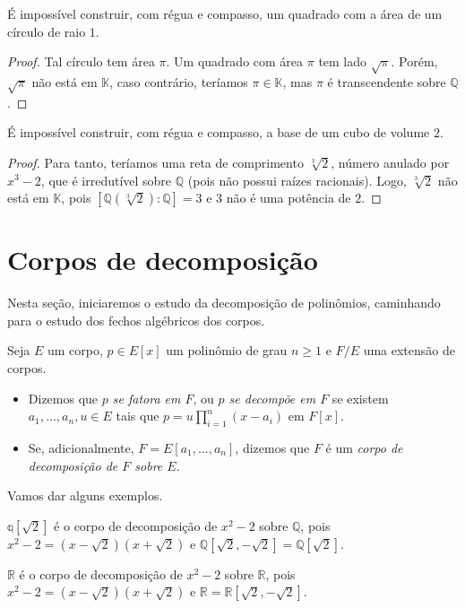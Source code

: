 \begin{prop}
    É impossível construir, com régua e compasso, um quadrado com a área de um círculo de raio $1$.
\end{prop}
\begin{proof}
Tal círculo tem área $\pi$. Um quadrado com área $\pi$ tem lado $\sqrt \pi$. Porém, $\sqrt \pi$ não está em $\mathbb K$, caso contrário, teríamos $\pi \in \mathbb K$, mas $\pi$ é transcendente sobre $\mathbb Q$.
\end{proof}

\begin{prop}
É impossível construir, com régua e compasso, a base de um cubo de volume $2$.
\end{prop}
\begin{proof}
    Para tanto, teríamos uma reta de comprimento $\sqrt[3]{2}$, número anulado por $x^3-2$, que é irredutível sobre $\mathbb Q$ (pois não possui raízes racionais). Logo, $\sqrt[3]{2}$ não está em $\mathbb K$, pois $[\mathbb Q(\sqrt[3]{2}):\mathbb Q]=3$ e $3$ não é uma potência de $2$.
\end{proof}

\section{Corpos de decomposição}

Nesta seção, iniciaremos o estudo da decomposição de polinômios, caminhando para o estudo dos fechos algébricos dos corpos.
\begin{definition}
    Seja $E$ um corpo, $p \in E[x]$ um polinômio de grau $n\geq 1$ e $F/E$ uma extensão de corpos.
    
    \begin{itemize}
        \item Dizemos que \emph{$p$ se fatora em $F$}, ou \emph{$p$ se decompõe em $F$} se existem $a_1, \dots, a_n, u \in E$ tais que $p=u\prod_{i=1}^n(x-a_i)$ em $F[x]$.
        \item Se, adicionalmente, $F=E[a_1, \dots, a_n]$, dizemos que $F$ é um \emph{corpo de decomposição de $F$ sobre $E$}.
    \end{itemize}
\end{definition}
Vamos dar alguns exemplos.
\begin{exemplo}
$\mathbb q[\sqrt 2]$ é o corpo de decomposição de $x^2-2$ sobre $\mathbb Q$, pois $x^2-2=(x-\sqrt 2)(x+\sqrt 2)$ e  $\mathbb Q\left[\sqrt 2, -\sqrt 2\right]=\mathbb Q\left[\sqrt 2\right]$.
\end{exemplo}
\begin{exemplo}
$\mathbb R$ é o corpo de decomposição de $x^2-2$ sobre $\mathbb R$, pois $x^2-2=(x-\sqrt 2)(x+\sqrt 2)$ e  $\mathbb R=\mathbb R\left[\sqrt 2, -\sqrt 2\right]$.
\end{exemplo}

